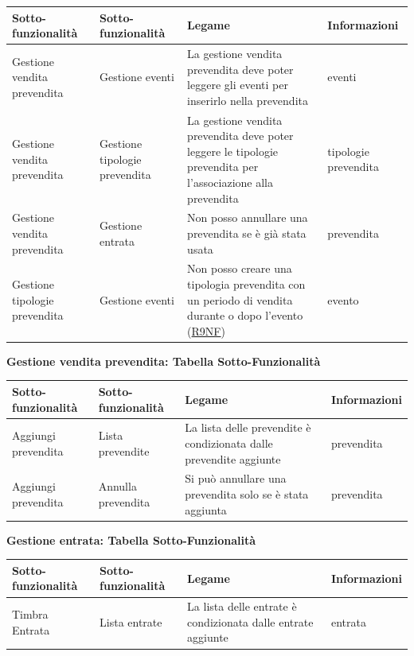 \documentclass[a4paper]{article}
\begin{document}
\begin{center}
    \begin{tabularx}{1\textwidth}{|X|X|X|X|}
    \hline
    \textbf{Sotto-funzionalità} & \textbf{Sotto-funzionalità} & \textbf{Legame} & \textbf{Informazioni}\\
    \hline
    \hline
    Gestione vendita prevendita & Gestione eventi & La gestione vendita prevendita deve poter leggere gli eventi per inserirlo nella prevendita & eventi\\
    \hline
    Gestione vendita prevendita & Gestione tipologie prevendita & La gestione vendita prevendita deve poter leggere le tipologie prevendita per l'associazione alla prevendita & tipologie prevendita\\
    \hline
    Gestione vendita prevendita & Gestione entrata & Non posso annullare una prevendita se è già stata usata & prevendita\\
    \hline
    Gestione tipologie prevendita & Gestione eventi & Non posso creare una tipologia prevendita con un periodo di vendita durante o dopo l'evento (\hyperlink{R9NF}{R9NF}) & evento\\
    \hline
    \end{tabularx}
\end{center}

\newpage

\textbf{Gestione vendita prevendita: Tabella Sotto-Funzionalità}

\begin{center}
    \begin{tabularx}{1\textwidth}{|X|X|X|X|}
    \hline
    \textbf{Sotto-funzionalità} & \textbf{Sotto-funzionalità} & \textbf{Legame} & \textbf{Informazioni}\\
    \hline
    \hline
    Aggiungi prevendita & Lista prevendite & La lista delle prevendite è condizionata dalle prevendite aggiunte & prevendita\\
    \hline
    Aggiungi prevendita & Annulla prevendita & Si può annullare una prevendita solo se è stata aggiunta & prevendita\\
    \hline
    \end{tabularx}
\end{center}

\textbf{Gestione entrata: Tabella Sotto-Funzionalità}

\begin{center}
    \begin{tabularx}{1\textwidth}{|X|X|X|X|}
    \hline
    \textbf{Sotto-funzionalità} & \textbf{Sotto-funzionalità} & \textbf{Legame} & \textbf{Informazioni}\\
    \hline
    \hline
    Timbra Entrata & Lista entrate & La lista delle entrate è condizionata dalle entrate aggiunte & entrata\\
    \hline
    \end{tabularx}
\end{center}
\end{document}
